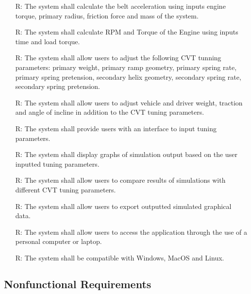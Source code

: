 \documentclass[12pt]{article}
\newcounter{reqnum} %
\begin{document}
\begin{itemize}
\item[R\refstepcounter{reqnum}\thereqnum \label{R_8}:] The system shall calculate the belt acceleration using inputs engine torque, primary radius, friction force and mass of the system. 

\item[R\refstepcounter{reqnum}\thereqnum \label{R_9}:] The system shall calculate RPM and Torque of the Engine using inputs time and load torque.

\item[R\refstepcounter{reqnum}\thereqnum \label{R_10}:] The system shall allow users to adjust the following CVT tunning parameters: primary weight, primary ramp geometry, primary spring rate, primary spring pretension, secondary helix geometry, secondary spring rate, secondary spring pretension. 

\item[R\refstepcounter{reqnum}\thereqnum \label{R_11}:] The system shall allow users to adjust vehicle and driver weight, traction and angle of incline in addition to the CVT tuning parameters.

\item[R\refstepcounter{reqnum}\thereqnum \label{R_12}:] The system shall provide users with an interface to input tuning parameters.

\item[R\refstepcounter{reqnum}\thereqnum \label{R_13}:] The system shall display graphs of simulation output based on the user inputted tuning parameters.

\item[R\refstepcounter{reqnum}\thereqnum \label{R_14}:] The system shall allow users to compare results of simulations with different CVT tuning parameters.

\item[R\refstepcounter{reqnum}\thereqnum \label{R_15}:] The system shall allow users to export outputted simulated graphical data.

\item[R\refstepcounter{reqnum}\thereqnum \label{R_16}:] The system shall allow users to access the application through the use of a personal computer or laptop.

\item[R\refstepcounter{reqnum}\thereqnum \label{R_17}:] The system shall be compatible with Windows, MacOS and Linux.
\end{itemize}

\subsection{Nonfunctional Requirements}
\end{document}
